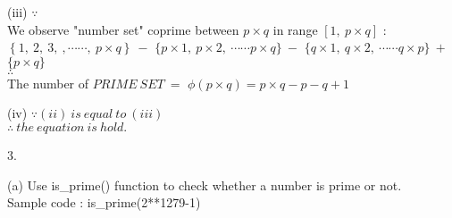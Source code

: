 \documentclass{article}
\begin{document}
\begin{enumerate*}
\begin{enumerate*}
\begin{enumerate*}
          \item [(iii)]
          $\because$ \\
          We observe "number set" coprime between $p \times q$ in range $[1,\ p\times q]$ : \\
          $\left\{ 1,\ 2,\ 3,\ ,\cdots\cdots,\ p \times q \right\}\ -$
          $\{p \times 1,\ p \times 2,\ \cdots\cdots p\times q \}\ -$
          $\{q \times 1,\ q \times 2,\ \cdots\cdots q\times p \}\ +$
          $\{p \times q\}$ \\
          $\therefore$ \\ 
          The number of $PRIME\ SET\ =$ 
          $\phi(p \times q)=p \times q - p - q + 1$ 
          \\

          \item [(iv)]
          $\because(ii)\ is\ equal\ to\ (iii)$ \\
          $\therefore\ the\ equation\ is\ hold.$
           
        \end{enumerate*}
      \item [3.]
      \begin{enumerate*}
        \item [(a)]
        Use is\_prime() function to check whether a number is prime or not.\\
        Sample code : is\_prime(2**1279-1)
      \end{enumerate*}

    \end{enumerate*}
  \end{enumerate*}
\end{document}
